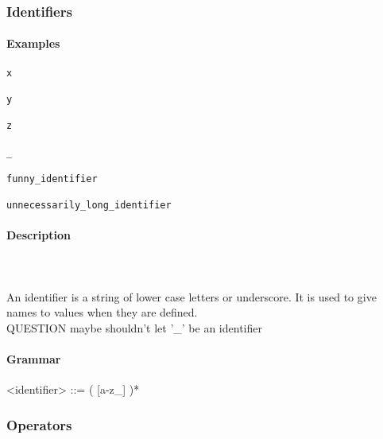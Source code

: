 \documentclass{article}
\def\pend{\mbox{} \\\\}
\begin{document}
\subsubsection{Identifiers}

\paragraph{Examples}

\begin{verbatim}
x

y

z 

_

funny_identifier 

unnecessarily_long_identifier
\end{verbatim}

\paragraph{Description}\pend
An identifier is a string of lower case letters or underscore. It is used to give
names to values when they are defined.
\\
QUESTION maybe shouldn't let '\_' be an identifier

\paragraph{Grammar}
\begin{grammar}
<identifier> ::= ( [a-z_] )*
\end{grammar}

\newpage
\subsubsection{Operators}
\end{document}
